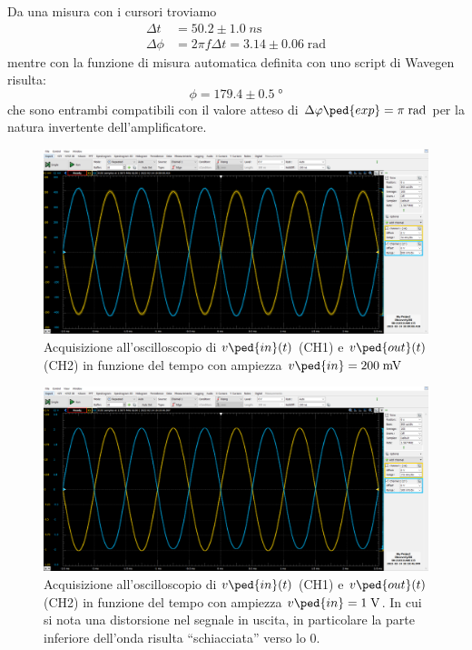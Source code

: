 \documentclass[10pt, a4paper, italian]{article}
\begin{document}
Da una misura con i cursori troviamo
\begin{align*}
\Delta t &= 50.2 \pm 1.0 \; \si{n\s} \\
\Delta \phi &= 2\pi f \Delta t = 3.14 \pm 0.06 \; \si{\radian}
\end{align*}
mentre con la funzione di misura automatica definita con uno script di Wavegen
risulta:
\[
\phi = 179.4 \pm 0.5 \; \si{\degree}
\]
che sono entrambi compatibili con il valore atteso di $\Delta \phi\ped{exp}
= \pi \; \si{\radian}$ per la natura invertente dell'amplificatore.
\begin{figure}[htbp]
    \centering
	\includegraphics[width=\textwidth]{amp.200}
    \caption{Acquisizione all'oscilloscopio di $v\ped{in} (t)$ (CH1) e
    $v\ped{out} (t)$ (CH2) in funzione del tempo con ampiezza
    $v\ped{in} = 200 \; \si{m\V}$}
\end{figure}
\begin{figure}[htbp]
    \centering
	\includegraphics[width=\textwidth]{amp.1000}
    \caption{Acquisizione all'oscilloscopio di $v\ped{in} (t)$ (CH1) e
    $v\ped{out} (t)$ (CH2) in funzione del tempo con ampiezza
    $v\ped{in} = 1 \; \si{\V}$. In cui si nota una distorsione nel segnale
    in uscita, in particolare la parte inferiore dell'onda risulta
    ``schiacciata'' verso lo 0.}
\end{figure}
\end{document}
